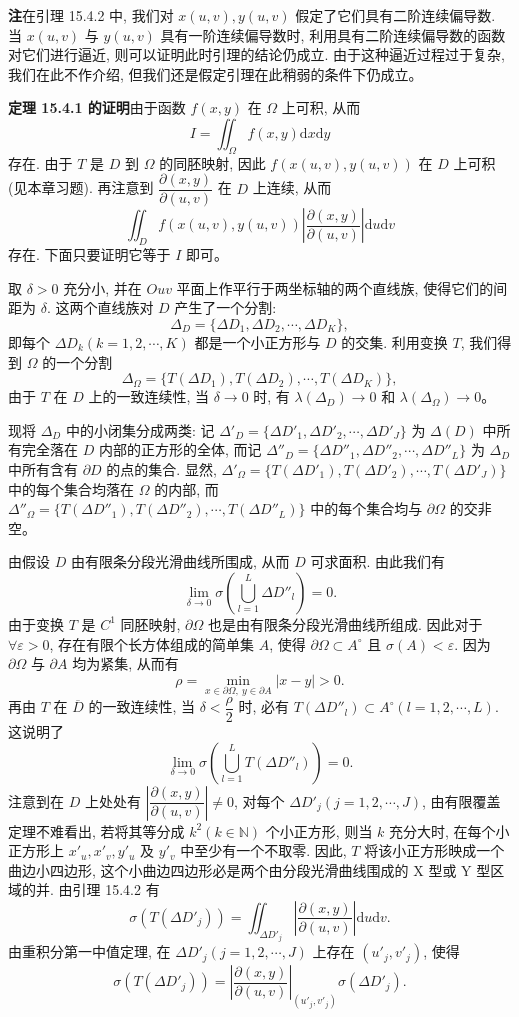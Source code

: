 \documentclass[UTF8, 12pt, fontset=fandol, oneside]{ctexart}
\begin{document}
\noindent\textbf{注}\quad 在引理 15.4.2 中, 我们对 $x(u,v),y(u,v)$ 假定了它们具有二阶连续偏导数. 当 $x(u,v)$ 与 $y(u,v)$ 具有一阶连续偏导数时, 利用具有二阶连续偏导数的函数对它们进行逼近, 则可以证明此时引理的结论仍成立. 由于这种逼近过程过于复杂, 我们在此不作介绍, 但我们还是假定引理在此稍弱的条件下仍成立。

\noindent\textbf{定理 15.4.1 的证明}\quad 由于函数 $f(x,y)$ 在 $\Omega$ 上可积, 从而
\[
  I=\iint_\Omega f(x,y)\mathrm dx\mathrm dy
\]
存在. 由于 $T$ 是 $D$ 到 $\Omega$ 的同胚映射, 因此 $f(x(u,v),y(u,v))$ 在 $D$ 上可积(见本章习题). 再注意到 $\dfrac{\partial(x,y)}{\partial(u,v)}$ 在 $D$ 上连续, 从而
\[
  \iint_D f(x(u,v),y(u,v))
  \left|\frac{\partial(x,y)}{\partial(u,v)}\right|\mathrm du\mathrm dv
\]
存在. 下面只要证明它等于 $I$ 即可。

取 $\delta>0$ 充分小, 并在 $Ouv$ 平面上作平行于两坐标轴的两个直线族, 使得它们的间距为 $\delta$. 这两个直线族对 $D$ 产生了一个分割:
\[
  \Delta_D=\{\Delta D_1,\Delta D_2,\cdots,\Delta D_K\},
\]
即每个 $\Delta D_k(k=1,2,\cdots,K)$ 都是一个小正方形与 $D$ 的交集. 利用变换 $T$, 我们得到 $\Omega$ 的一个分割
\[
  \Delta_\Omega=\{T(\Delta D_1),T(\Delta D_2),\cdots,T(\Delta D_K)\},
\]
由于 $T$ 在 $D$ 上的一致连续性, 当 $\delta\to0$ 时, 有 $\lambda(\Delta_D)\to0$ 和 $\lambda(\Delta_\Omega)\to0$。

现将 $\Delta_D$ 中的小闭集分成两类: 记 $\Delta'_D=\{\Delta D'_1,\Delta D'_2,\cdots,\Delta D'_J\}$ 为 $\Delta(D)$ 中所有完全落在 $D$ 内部的正方形的全体, 而记 $\Delta''_D=\{\Delta D''_1,\Delta D''_2,\cdots,\Delta D''_L\}$ 为 $\Delta_D$ 中所有含有 $\partial D$ 的点的集合. 显然, $\Delta'_\Omega=\{T(\Delta D'_1),T(\Delta D'_2),\cdots,T(\Delta D'_J)\}$ 中的每个集合均落在 $\Omega$ 的内部, 而 $\Delta''_\Omega=\{T(\Delta D''_1),T(\Delta D''_2),\cdots,T(\Delta D''_L)\}$ 中的每个集合均与 $\partial\Omega$ 的交非空。

由假设 $D$ 由有限条分段光滑曲线所围成, 从而 $D$ 可求面积. 由此我们有
\[
  \lim_{\delta\to0}\sigma\left(\bigcup_{l=1}^L\Delta D''_l\right)=0.
\]
由于变换 $T$ 是 $C^1$ 同胚映射, $\partial\Omega$ 也是由有限条分段光滑曲线所组成. 因此对于 $\forall\varepsilon>0$, 存在有限个长方体组成的简单集 $A$, 使得 $\partial\Omega\subset A^\circ$ 且 $\sigma(A)<\varepsilon$. 因为 $\partial\Omega$ 与 $\partial A$ 均为紧集, 从而有
\[
  \rho=\min_{x\in\partial\Omega,\ y\in\partial A}|x-y|>0.
\]
再由 $T$ 在 $\overline D$ 的一致连续性, 当 $\delta<\dfrac\rho2$ 时, 必有 $T(\Delta D''_l)\subset A^\circ(l=1,2,\cdots,L)$. 这说明了
\[
  \lim_{\delta\to0}\sigma\left(\bigcup_{l=1}^LT(\Delta D''_l)\right)=0.
\]
注意到在 $D$ 上处处有 $\left|\dfrac{\partial(x,y)}{\partial(u,v)}\right|\ne0$, 对每个 $\Delta D'_j(j=1,2,\cdots,J)$, 由有限覆盖定理不难看出, 若将其等分成 $k^2(k\in\mathbb N)$ 个小正方形, 则当 $k$ 充分大时, 在每个小正方形上 $x'_u,x'_v,y'_u$ 及 $y'_v$ 中至少有一个不取零. 因此, $T$ 将该小正方形映成一个曲边小四边形, 这个小曲边四边形必是两个由分段光滑曲线围成的 X 型或 Y 型区域的并. 由引理 15.4.2 有
\[
  \sigma(T(\Delta D'_j))
  =\iint_{\Delta D'_j}\left|\frac{\partial(x,y)}{\partial(u,v)}\right|\mathrm du\mathrm dv.
\]
由重积分第一中值定理, 在 $\Delta D'_j(j=1,2,\cdots,J)$ 上存在 $(u'_j,v'_j)$, 使得
\[
  \sigma(T(\Delta D'_j))
  =\left|\frac{\partial(x,y)}{\partial(u,v)}\right|_{(u'_j,v'_j)}
  \sigma(\Delta D'_j).
\]
\end{document}
